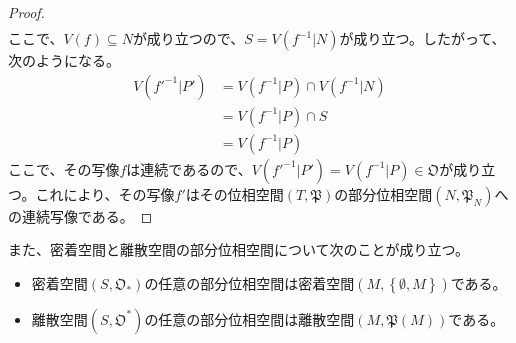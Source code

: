 \documentclass[dvipdfmx]{jsarticle}
\begin{document}
\begin{proof}
\begin{align*}
\end{align*}
ここで、$V(f) \subseteq N$が成り立つので、$S = V\left( f^{- 1}|N \right)$が成り立つ。したがって、次のようになる。
\begin{align*}
V\left( {f'}^{- 1}|P' \right) &= V\left( f^{- 1}|P \right) \cap V\left( f^{- 1}|N \right)\\
&= V\left( f^{- 1}|P \right) \cap S\\
&= V\left( f^{- 1}|P \right)
\end{align*}
ここで、その写像$f$は連続であるので、$V\left( {f'}^{- 1}|P' \right) = V\left( f^{- 1}|P \right)\in \mathfrak{O}$が成り立つ。これにより、その写像$f'$はその位相空間$\left( T,\mathfrak{P} \right)$の部分位相空間$\left( N,\mathfrak{P}_{N} \right)$への連続写像である。
\end{proof}
\begin{thm}\label{8.1.4.15}
また、密着空間と離散空間の部分位相空間について次のことが成り立つ。
\begin{itemize}
\item
  密着空間$\left( S,\mathfrak{O}_{*} \right)$の任意の部分位相空間は密着空間$\left( M,\left\{ \emptyset,M \right\} \right)$である。
\item
  離散空間$\left( S,\mathfrak{O}^{*} \right)$の任意の部分位相空間は離散空間$\left( M,\mathfrak{P}(M) \right)$である。
\end{itemize}
\end{thm}
\end{document}
